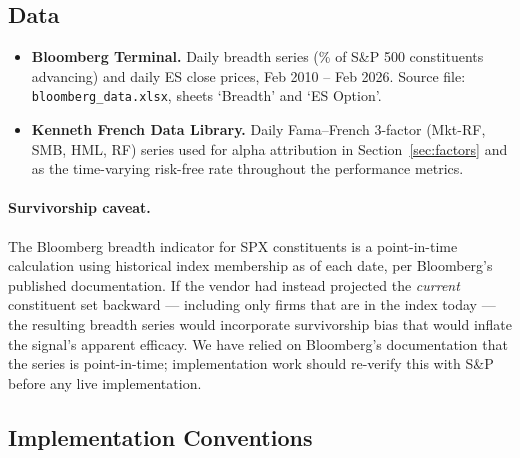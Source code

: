 \documentclass[11pt]{article}
\begin{document}
\subsection{Data}

\begin{itemize}
\item \textbf{Bloomberg Terminal.} Daily breadth series (\% of S\&P 500
constituents advancing) and daily ES close prices, Feb 2010 -- Feb 2026.
Source file: \texttt{bloomberg\_data.xlsx}, sheets `Breadth' and
`ES Option'.
\item \textbf{Kenneth French Data Library.} Daily Fama--French 3-factor
(Mkt-RF, SMB, HML, RF) series used for alpha attribution in
Section~\ref{sec:factors} and as the time-varying risk-free rate
throughout the performance metrics.
\end{itemize}

\paragraph{Survivorship caveat.} The Bloomberg breadth indicator for SPX
constituents is a point-in-time calculation using historical index
membership as of each date, per Bloomberg's published documentation. If the
vendor had instead projected the \emph{current} constituent set backward ---
including only firms that are in the index today --- the resulting breadth
series would incorporate survivorship bias that would inflate the signal's
apparent efficacy. We have relied on Bloomberg's documentation that the
series is point-in-time; implementation work should re-verify this
with S\&P before any live implementation.

\subsection{Implementation Conventions}
\end{document}
